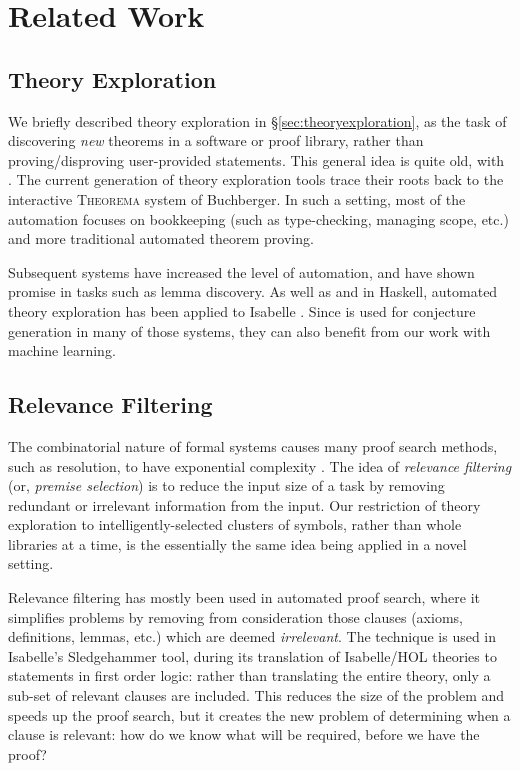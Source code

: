 \section{Related Work}
\label{sec:related}

\subsection{Theory Exploration}

We briefly described theory exploration in \S \ref{sec:theoryexploration}, as the task of discovering \emph{new} theorems in a software or proof library, rather than proving/disproving user-provided statements. This general idea is quite old, with . The current generation of theory exploration tools trace their roots back to the interactive \textsc{Theorema} \cite{buchberger2000theory} system of Buchberger. In such a setting, most of the automation focuses on bookkeeping (such as type-checking, managing scope, etc.) and more traditional automated theorem proving.

Subsequent systems have increased the level of automation, and have shown promise in tasks such as lemma discovery. As well as \qspec{} and \hspec{} in Haskell, automated theory exploration has been applied to Isabelle \cite{Montano-Rivas.McCasland.Dixon.ea:2012} \cite{johansson2009isacosy} \cite{Hipster}. Since \qspec{} is used for conjecture generation in many of those systems, they can also benefit from our work with machine learning.

\subsection{Relevance Filtering}
\label{sec:relevance}

The combinatorial nature of formal systems causes many proof search methods, such as resolution, to have exponential complexity \cite{haken1985intractability}. The idea of \emph{relevance filtering} (or, \emph{premise selection}) is to reduce the input size of a task by removing redundant or irrelevant information from the input. Our restriction of theory exploration to intelligently-selected clusters of symbols, rather than whole libraries at a time, is the essentially the same idea being applied in a novel setting.

Relevance filtering has mostly been used in automated proof search, where it simplifies problems by removing from consideration those clauses (axioms, definitions, lemmas, etc.) which are deemed \emph{irrelevant}. The technique is used in Isabelle's Sledgehammer tool, during its translation of Isabelle/HOL theories to statements in first order logic: rather than translating the entire theory, only a sub-set of relevant clauses are included. This reduces the size of the problem and speeds up the proof search, but it creates the new problem of determining when a clause is relevant: how do we know what will be required, before we have the proof?

